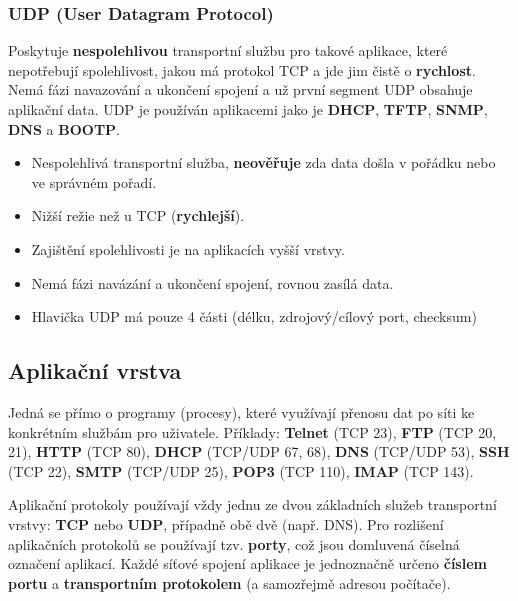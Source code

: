 \subsubsection{UDP (User Datagram Protocol)}
Poskytuje \textbf{nespolehlivou} transportní službu pro takové aplikace, které nepotřebují spolehlivost, jakou má protokol TCP a jde jim čistě o \textbf{rychlost}. Nemá fázi navazování a ukončení spojení a už první segment UDP obsahuje aplikační data. UDP je používán aplikacemi jako je \textbf{DHCP}, \textbf{TFTP}, \textbf{SNMP}, \textbf{DNS} a \textbf{BOOTP}.
\begin{itemize}
	\item Nespolehlivá transportní služba, \textbf{neověřuje} zda data došla v pořádku nebo ve správném pořadí.
	\item Nižší režie než u TCP (\textbf{rychlejší}).
	\item Zajištění spolehlivosti je na aplikacích vyšší vrstvy.
	\item Nemá fázi navázání a ukončení spojení, rovnou zasílá data.
	\item Hlavička UDP má pouze 4 části (délku, zdrojový/cílový port, checksum)
\end{itemize}

\noindent{}

\subsection{Aplikační vrstva}
Jedná se přímo o programy (procesy), které využívají přenosu dat po síti ke konkrétním službám pro uživatele. Příklady: \textbf{Telnet} (TCP 23), \textbf{FTP} (TCP 20, 21), \textbf{HTTP} (TCP 80), \textbf{DHCP} (TCP/UDP 67, 68), \textbf{DNS} (TCP/UDP 53), \textbf{SSH} (TCP 22), \textbf{SMTP} (TCP/UDP 25), \textbf{POP3} (TCP 110), \textbf{IMAP} (TCP 143).

Aplikační protokoly používají vždy jednu ze dvou základních služeb transportní vrstvy: \textbf{TCP} nebo \textbf{UDP}, případně obě dvě (např. DNS). Pro rozlišení aplikačních protokolů se používají tzv. \textbf{porty}, což jsou domluvená číselná označení aplikací. Každé síťové spojení aplikace je jednoznačně určeno \textbf{číslem portu} a \textbf{transportním protokolem} (a samozřejmě adresou počítače).